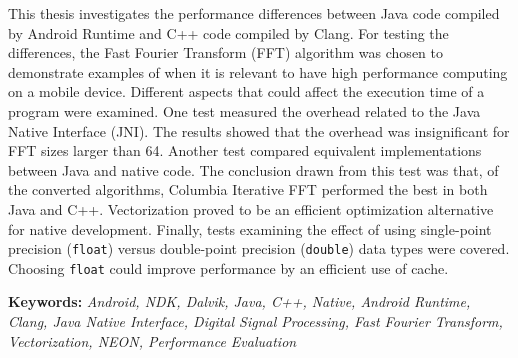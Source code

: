 This thesis investigates the performance differences between Java code compiled by Android Runtime and C++ code compiled by Clang. For testing the differences, the Fast Fourier Transform (FFT) algorithm was chosen to demonstrate examples of when it is relevant to have high performance computing on a mobile device. Different aspects that could affect the execution time of a program were examined. One test measured the overhead related to the Java Native Interface (JNI). The results showed that the overhead was insignificant for FFT sizes larger than 64. Another test compared equivalent implementations between Java and native code. The conclusion drawn from this test was that, of the converted algorithms, Columbia Iterative FFT performed the best in both Java and C++. Vectorization proved to be an efficient optimization alternative for native development. Finally, tests examining the effect of using single-point precision (\texttt{float}) versus double-point precision (\texttt{double}) data types were covered. Choosing \texttt{float} could improve performance by an efficient use of cache.

\textbf{Keywords:} \emph{Android, NDK, Dalvik, Java, C++, Native, Android Runtime, Clang, Java Native Interface, Digital Signal Processing, Fast Fourier Transform, Vectorization, NEON, Performance Evaluation}
